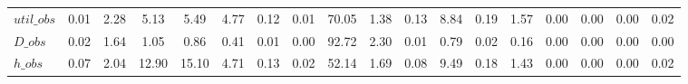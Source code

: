 \begin{center}
\begin{longtable}{lccccccccccccccccc}
$util\_obs      $	 & 	            0.01	 & 	            2.28	 & 	            5.13	 & 	            5.49	 & 	            4.77	 & 	            0.12	 & 	            0.01	 & 	           70.05	 & 	            1.38	 & 	            0.13	 & 	            8.84	 & 	            0.19	 & 	            1.57	 & 	            0.00	 & 	            0.00	 & 	            0.00	 & 	            0.02 \\ 
$D\_obs         $	 & 	            0.02	 & 	            1.64	 & 	            1.05	 & 	            0.86	 & 	            0.41	 & 	            0.01	 & 	            0.00	 & 	           92.72	 & 	            2.30	 & 	            0.01	 & 	            0.79	 & 	            0.02	 & 	            0.16	 & 	            0.00	 & 	            0.00	 & 	            0.00	 & 	            0.00 \\ 
$h\_obs         $	 & 	            0.07	 & 	            2.04	 & 	           12.90	 & 	           15.10	 & 	            4.71	 & 	            0.13	 & 	            0.02	 & 	           52.14	 & 	            1.69	 & 	            0.08	 & 	            9.49	 & 	            0.18	 & 	            1.43	 & 	            0.00	 & 	            0.00	 & 	            0.00	 & 	            0.02 \\ 
\end{longtable}
 \end{center}

